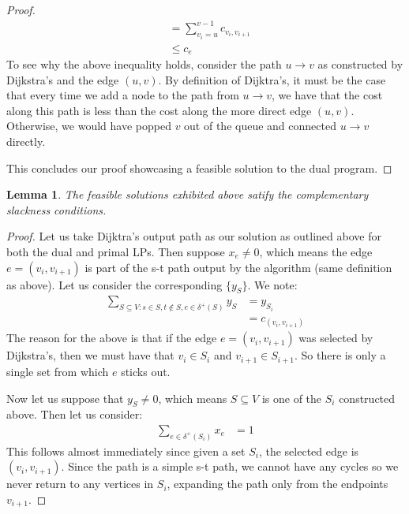 \documentclass[12pt]{exam}
\newtheorem{lemma}[theorem]{Lemma}
\begin{document}
\begin{questions}
\begin{solution}
\begin{enumerate}[label=(\alph*)]
\begin{proof}
\begin{align*}
            &= \sum_{v_i = u}^{v-1} c_{v_{i},v_{i+1}} \tag{The length of the path selected by Dijkstra's from $u$ to $v$} \\
            &\leq c_e
        \end{align*}
        To see why the above inequality holds, consider the path $u \to v$ as constructed by Dijkstra's and the edge $(u,v)$. By definition of Dijktra's, it must be the case that every time we add a node to the path from $u \to v$, we have that the cost along this path is less than the cost along the more direct edge $(u,v)$. Otherwise, we would have popped $v$ out of the queue and connected $u \to v$ directly.

        This concludes our proof showcasing a feasible solution to the dual program.
      \end{proof}

      \begin{lemma}
        The feasible solutions exhibited above satify the complementary slackness conditions.
      \end{lemma}
      \begin{proof}
        Let us take Dijktra's output path as our solution as outlined above for both the dual and primal LPs. Then suppose $x_e \neq 0$, which means the edge $e = (v_{i},v_{i+1})$ is part of the s-t path output by the algorithm (same definition as above). Let us consider the corresponding $\{y_S\}$. We note:
        \begin{align*}
          \sum_{S \subseteq V : s\in S, t \notin S, e \in \delta^+(S)} y_S &= y_{S_i} \tag{The edge sticks out of only $S_i$} \\
          &= c_(v_{i},v_{i+1}) \tag{By definition}
        \end{align*}
        The reason for the above is that if the edge $e = (v_i,v_{i+1})$ was selected by Dijkstra's, then we must have that $v_i \in S_i$ and $v_{i+1} \in S_{i + 1}$. So there is only a single set from which $e$ sticks out. 


        Now let us suppose that $y_S \neq 0$, which means $S \subseteq V$ is one of the $S_i$ constructed above. Then let us consider:
        \begin{align*}
          \sum_{e \in \delta^+(S_i)} x_e &= 1
        \end{align*}
        This follows almost immediately since given a set $S_i$, the selected edge is $(v_i, v_{i+1})$. Since the path is a simple s-t path, we cannot have any cycles so we never return to any vertices in $S_i$, expanding the path only from the endpoints $v_{i+1}$.
      \end{proof}


\end{enumerate}
\end{solution}
\end{questions}
\end{document}

